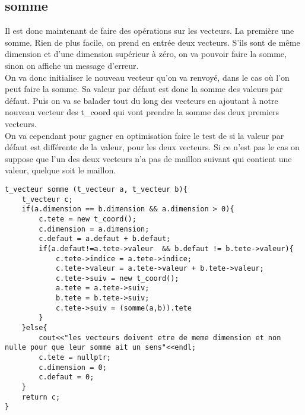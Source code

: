 \documentclass[a4paper,11pt,final]{article}
\begin{document}
\subsection{somme}
Il est donc maintenant de faire des opérations sur les vecteurs. La première une somme. Rien de plus facile, on prend en entrée deux vecteurs. S'ils sont de même dimension et d'une dimension supérieur à zéro, on va pouvoir faire la somme, sinon on affiche un message d'erreur.\\
On va donc initialiser le nouveau vecteur qu'on va renvoyé, dans le cas où l'on peut faire la somme. Sa valeur par défaut est donc la somme des valeurs par défaut. Puis on va se balader tout du long des vecteurs en ajoutant à notre nouveau vecteur des t_coord qui vont prendre la somme des deux premiers vecteurs.\\
On va cependant pour gagner en optimisation faire le test de si la valeur par défaut est différente de la valeur, pour les deux vecteurs. Si ce n'est pas le cas on suppose que l'un des deux vecteurs n'a pas de maillon suivant qui contient une valeur, quelque soit le maillon.
\begin{verbatim}
t_vecteur somme (t_vecteur a, t_vecteur b){
    t_vecteur c;
    if(a.dimension == b.dimension && a.dimension > 0){
        c.tete = new t_coord();
        c.dimension = a.dimension;
        c.defaut = a.defaut + b.defaut;
        if(a.defaut!=a.tete->valeur  && b.defaut != b.tete->valeur){
            c.tete->indice = a.tete->indice;
            c.tete->valeur = a.tete->valeur + b.tete->valeur;
            c.tete->suiv = new t_coord();
            a.tete = a.tete->suiv;
            b.tete = b.tete->suiv;
            c.tete->suiv = (somme(a,b)).tete
        }
    }else{
        cout<<"les vecteurs doivent etre de meme dimension et non nulle pour que leur somme ait un sens"<<endl;
        c.tete = nullptr;
        c.dimension = 0;
        c.defaut = 0;
    }
    return c;
}

\end{verbatim}
\end{document}
